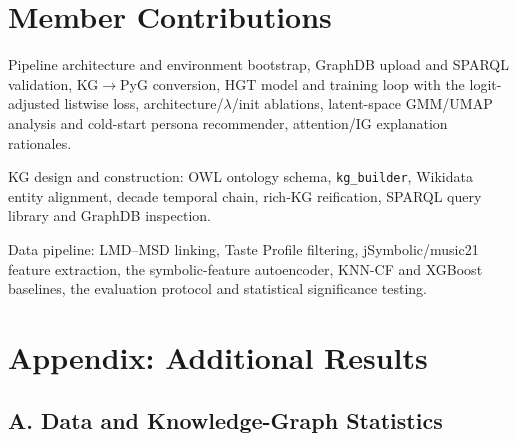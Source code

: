 \documentclass[10pt,twocolumn,letterpaper]{article}
\begin{document}
\section{Member Contributions}
\label{sec:contributions}
\begin{description}\setlength\itemsep{2pt}
  \item[\normalfont\textbf{Pedro Fanica (54346)}] Pipeline architecture and
        environment bootstrap, GraphDB upload and SPARQL validation, KG$\to$PyG
        conversion, HGT model and training loop with the logit-adjusted listwise
        loss, architecture/$\lambda$/init ablations, latent-space GMM/UMAP analysis
        and cold-start persona recommender, attention/IG explanation rationales.
  \item[\normalfont\textbf{Aarthi Perumpillichira (66404)}] KG design and
        construction: OWL ontology schema, \texttt{kg\_builder}, Wikidata entity
        alignment, decade temporal chain, rich-KG reification, SPARQL query library
        and GraphDB inspection.
  \item[\normalfont\textbf{Maja Skwaro\'n (66083)}] Data pipeline: LMD--MSD linking,
        Taste Profile filtering, jSymbolic/music21 feature extraction, the
        symbolic-feature autoencoder, KNN-CF and XGBoost baselines, the evaluation
        protocol and statistical significance testing.
\end{description}

{
  \small
  
  
}

\clearpage
\onecolumn
\appendix
\section*{Appendix: Additional Results}

\subsection*{A. Data and Knowledge-Graph Statistics}
\end{document}
